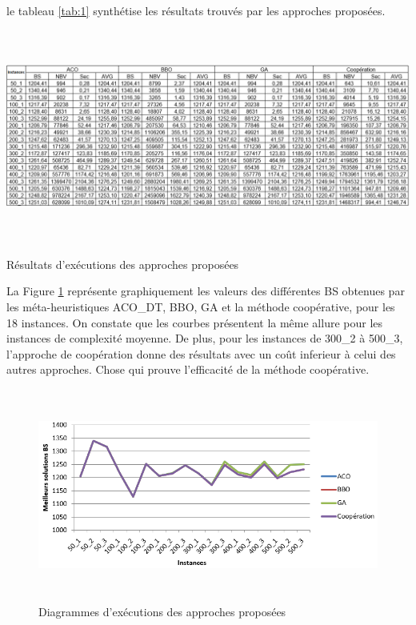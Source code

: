 le tableau \ref{tab:1} synthétise les résultats trouvés par les approches proposées.


\begin{table}[H]
	\includegraphics[width=17cm,height=7cm]{Chap5/t1.png}
	\caption{Résultats d’exécutions des  approches proposées}
	\label{tab:1}
\end{table}




La Figure \ref{fig:DEAP} représente graphiquement les valeurs des différentes BS obtenues
par les méta-heuristiques  ACO\_DT, BBO, GA et la méthode coopérative, pour les 18 instances. On constate que les courbes présentent la même allure pour les instances de complexité moyenne. De plus, pour les instances de 300\_2 à 500\_3, l’approche de coopération  donne des résultats avec un coût inferieur à celui des autres approches. Chose qui prouve l’efficacité de la méthode coopérative.

\begin{figure}[H]
	\centering
	\includegraphics[width=16cm,height=7cm]{Chap5/5.png}
	\caption{Diagrammes d’exécutions des approches proposées}
	\label{fig:DEAP}
\end{figure}



